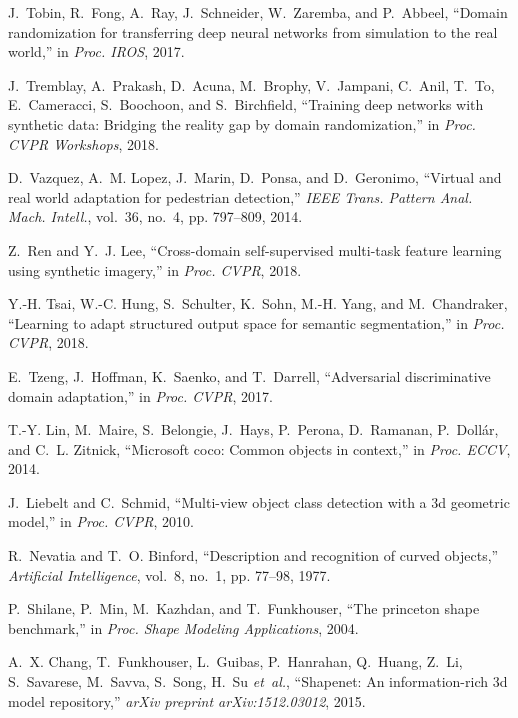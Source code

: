 \documentclass[final]{IEEEtran}
\begin{document}
{\begin{minipage}{\textwidth}
\begin{thebibliography}{1}
J.~Tobin, R.~Fong, A.~Ray, J.~Schneider, W.~Zaremba, and P.~Abbeel, ``Domain
  randomization for transferring deep neural networks from simulation to the
  real world,'' in \emph{Proc. IROS}, 2017.

J.~Tremblay, A.~Prakash, D.~Acuna, M.~Brophy, V.~Jampani, C.~Anil, T.~To,
  E.~Cameracci, S.~Boochoon, and S.~Birchfield, ``Training deep networks with
  synthetic data: Bridging the reality gap by domain randomization,'' in
  \emph{Proc. CVPR Workshops}, 2018.

D.~Vazquez, A.~M. Lopez, J.~Marin, D.~Ponsa, and D.~Geronimo, ``Virtual and
  real world adaptation for pedestrian detection,'' \emph{IEEE Trans. Pattern
  Anal. Mach. Intell.}, vol.~36, no.~4, pp. 797--809, 2014.

Z.~Ren and Y.~J. Lee, ``Cross-domain self-supervised multi-task feature
  learning using synthetic imagery,'' in \emph{Proc. CVPR}, 2018.

Y.-H. Tsai, W.-C. Hung, S.~Schulter, K.~Sohn, M.-H. Yang, and M.~Chandraker,
  ``Learning to adapt structured output space for semantic segmentation,'' in
  \emph{Proc. CVPR}, 2018.

E.~Tzeng, J.~Hoffman, K.~Saenko, and T.~Darrell, ``Adversarial discriminative
  domain adaptation,'' in \emph{Proc. CVPR}, 2017.

T.-Y. Lin, M.~Maire, S.~Belongie, J.~Hays, P.~Perona, D.~Ramanan,
  P.~Doll{\'a}r, and C.~L. Zitnick, ``Microsoft coco: Common objects in
  context,'' in \emph{Proc. ECCV}, 2014.

J.~Liebelt and C.~Schmid, ``Multi-view object class detection with a 3d
  geometric model,'' in \emph{Proc. CVPR}, 2010.

R.~Nevatia and T.~O. Binford, ``Description and recognition of curved
  objects,'' \emph{Artificial Intelligence}, vol.~8, no.~1, pp. 77--98, 1977.

P.~Shilane, P.~Min, M.~Kazhdan, and T.~Funkhouser, ``The princeton shape
  benchmark,'' in \emph{Proc. Shape Modeling Applications}, 2004.

A.~X. Chang, T.~Funkhouser, L.~Guibas, P.~Hanrahan, Q.~Huang, Z.~Li,
  S.~Savarese, M.~Savva, S.~Song, H.~Su \emph{et~al.}, ``Shapenet: An
  information-rich 3d model repository,'' \emph{arXiv preprint
  arXiv:1512.03012}, 2015.


\end{thebibliography}
\end{minipage}}
\end{document}
